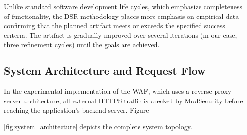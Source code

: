 \documentclass[10pt,conference]{IEEEtran}
\begin{document}
Unlike standard software development life cycles, which emphasize completeness of functionality, the DSR methodology places more emphasis on empirical data confirming that the planned artifact meets or exceeds the specified success criteria. The artifact is gradually improved over several iterations (in our case, three refinement cycles) until the goals are achieved.

\subsection{System Architecture and Request Flow}

In the experimental implementation of the WAF, which uses a reverse proxy server architecture, all external HTTPS traffic is checked by ModSecurity before reaching the application's backend server. Figure

\ref{fig:system_architecture} depicts the complete system topology.
\end{document}
